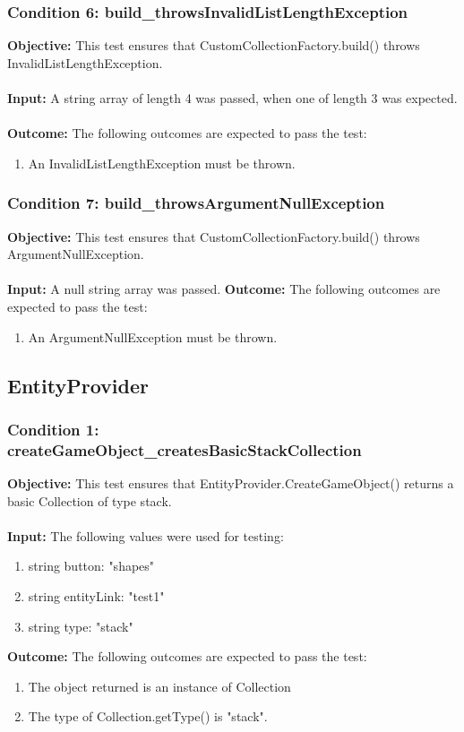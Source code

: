 \documentclass[a4paper,12pt]{article}
\begin{document}
		\subsubsection{Condition 6: build\_throwsInvalidListLengthException}
			\textbf{Objective:} This test ensures that CustomCollectionFactory.build() throws InvalidListLengthException.\\\\
			\textbf{Input:} A string array of length 4 was passed, when one of length 3 was expected.\\\\
			\textbf{Outcome:} The following outcomes are expected to pass the test:
				\begin{enumerate}
					\item An InvalidListLengthException must be thrown.
				\end{enumerate}
		\subsubsection{Condition 7: build\_throwsArgumentNullException}
			\textbf{Objective:} This test ensures that CustomCollectionFactory.build() throws ArgumentNullException.\\\\
			\textbf{Input:} A null string array was passed.
			\textbf{Outcome:} The following outcomes are expected to pass the test:
				\begin{enumerate}
					\item An ArgumentNullException must be thrown.
				\end{enumerate}
	\subsection{EntityProvider}
		\subsubsection{Condition 1: createGameObject\_createsBasicStackCollection}
			\textbf{Objective:} This test ensures that EntityProvider.CreateGameObject() returns a basic Collection of type stack.\\\\
			\textbf{Input:} The following values were used for testing:
				\begin{enumerate}
					\item string button: "shapes"
					\item string entityLink: "test1"
					\item string type: "stack"
				\end{enumerate}
			\textbf{Outcome:} The following outcomes are expected to pass the test:
				\begin{enumerate}
					\item The object returned is an instance of Collection
					\item The type of Collection.getType() is "stack".
				\end{enumerate}
\end{document}
